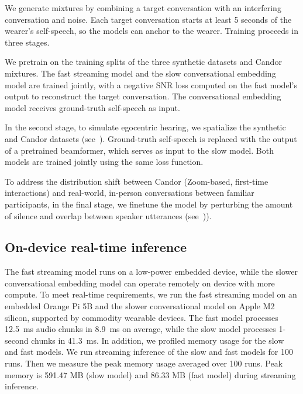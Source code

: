 We generate  mixtures by combining a target conversation with an interfering conversation and  noise. Each target conversation starts at least 5 seconds of the wearer’s self-speech, so the models can anchor to the wearer. Training proceeds in three stages.





 We pretrain on the training splits of the three synthetic datasets and Candor mixtures. The fast streaming model and the slow conversational embedding model are trained jointly, with a negative SNR loss computed on the fast  model’s output to reconstruct the target conversation. The conversational embedding model receives ground-truth self-speech as input.


In the second stage, to simulate egocentric hearing, we spatialize the synthetic and Candor datasets (see~). Ground-truth self-speech is replaced with the output of a pretrained beamformer, which serves as input to the slow  model. Both models are trained jointly using the same loss function.


To address the distribution shift between Candor (Zoom-based, first-time interactions) and real-world, in-person conversations between familiar participants, in the final stage, we finetune the model by perturbing the amount of silence and overlap between speaker utterances (see~)). 


\subsection{On-device real-time inference}
The fast streaming model runs on a low-power embedded device, while the slower conversational embedding  model can operate remotely on device with more compute. 
To meet real-time requirements, we run the fast streaming model on an embedded Orange Pi 5B and the slower conversational model on Apple M2 silicon, supported by commodity wearable devices. The fast model processes 12.5~ms audio chunks in 8.9~ms on average, while the slow model processes 1-second chunks in 41.3~ms. {In addition, we profiled memory usage for the slow and fast models. We run streaming inference of the slow and fast models for 100 runs. Then we measure the peak memory usage averaged over 100 runs. Peak memory is 591.47 MB (slow model) and 86.33 MB (fast model) during streaming inference.}
 




